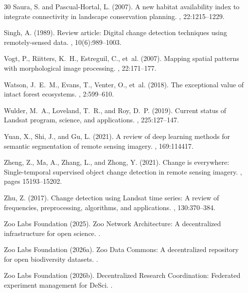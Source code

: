 \documentclass[11pt,a4paper]{article}
\begin{document}
\begin{thebibliography}{30}
Saura, S. and Pascual-Hortal, L. (2007).
\newblock A new habitat availability index to integrate connectivity in landscape conservation planning.
, 22:1215--1229.

Singh, A. (1989).
\newblock Review article: Digital change detection techniques using remotely-sensed data.
, 10(6):989--1003.

Vogt, P., Riitters, K.~H., Estreguil, C., et~al. (2007).
\newblock Mapping spatial patterns with morphological image processing.
, 22:171--177.

Watson, J.~E.~M., Evans, T., Venter, O., et~al. (2018).
\newblock The exceptional value of intact forest ecosystems.
, 2:599--610.

Wulder, M.~A., Loveland, T.~R., and Roy, D.~P. (2019).
\newblock Current status of Landsat program, science, and applications.
, 225:127--147.

Yuan, X., Shi, J., and Gu, L. (2021).
\newblock A review of deep learning methods for semantic segmentation of remote sensing imagery.
, 169:114417.

Zheng, Z., Ma, A., Zhang, L., and Zhong, Y. (2021).
\newblock Change is everywhere: Single-temporal supervised object change detection in remote sensing imagery.
, pages 15193--15202.

Zhu, Z. (2017).
\newblock Change detection using Landsat time series: A review of frequencies, preprocessing, algorithms, and applications.
, 130:370--384.

Zoo Labs Foundation (2025).
\newblock Zoo Network Architecture: A decentralized infrastructure for open science.
.

Zoo Labs Foundation (2026a).
\newblock Zoo Data Commons: A decentralized repository for open biodiversity datasets.
.

Zoo Labs Foundation (2026b).
\newblock Decentralized Research Coordination: Federated experiment management for DeSci.
.

\end{thebibliography}
\end{document}
